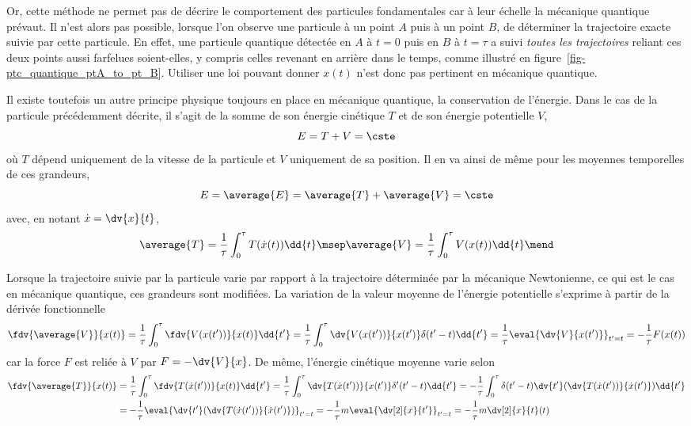 \par
Or, cette méthode ne permet pas de décrire le comportement des particules fondamentales
car à leur échelle la mécanique quantique prévaut.
Il n'est alors pas possible, lorsque l'on observe une particule à un point $A$ puis à un point $B$, de déterminer la trajectoire exacte suivie par cette particule.
En effet,
une particule quantique détectée
en $A$ à $t=0$ puis en $B$ à $t=\tau$
a suivi \emph{toutes les trajectoires} reliant ces deux points
aussi farfelues soient-elles,
y compris celles revenant en arrière dans le temps,
comme illustré en figure~\ref{fig-ptc_quantique_ptA_to_pt_B}.
Utiliser une loi pouvant donner $x(t)$ n'est donc pas pertinent en mécanique quantique.
\par
Il existe toutefois un autre principe physique toujours en place en mécanique quantique, la conservation de l'énergie.
Dans le cas de la particule précédemment décrite, il s'agit de la somme de son énergie cinétique $T$ et de son énergie potentielle $V$, \ie
\begin{equation}
E = T + V = \cste
\end{equation}
où $T$ dépend uniquement de la vitesse de la particule et $V$ uniquement de sa position. %
Il en va ainsi de même pour les moyennes temporelles de ces grandeurs,
\begin{equation}
E = \average{E} = \average{T} + \average{V} = \cste
\end{equation}
avec, en notant $\dot{x}=\dv{x}{t}$,
\begin{equation}
\average{T} = \frac{1}{\tau}\int_0^\tau T(\dot{x}(t)) \dd{t}
\msep
\average{V} = \frac{1}{\tau}\int_0^\tau V(x(t)) \dd{t}
\mend
\end{equation}
\par
Lorsque la trajectoire suivie par la particule varie par rapport à la trajectoire déterminée par la mécanique Newtonienne, ce qui est le cas en mécanique quantique, ces grandeurs sont modifiées.
La variation de la valeur moyenne de l'énergie potentielle s'exprime à partir de la dérivée fonctionnelle
\begin{equation}
\fdv{\average{V}}{x(t)}
= \frac{1}{\tau}\int_0^\tau \fdv{V(x(t'))}{x(t)} \dd{t'}
= \frac{1}{\tau}\int_0^\tau \dv{V(x(t'))}{x(t')}\delta(t'-t) \dd{t'}
= \frac{1}{\tau}\eval{\dv{V}{x(t')}}_{t'=t}
= -\frac{1}{\tau}F(x(t))
\end{equation}
car la force $F$ est reliée à $V$ par $F = - \dv{V}{x}$.
De même, l'énergie cinétique moyenne varie selon
\begin{align}
\fdv{\average{T}}{x(t)}
&
= \frac{1}{\tau}\int_0^\tau \fdv{T(\dot{x}(t'))}{x(t)} \dd{t'}
=\frac{1}{\tau}\int_0^\tau \dv{T(\dot{x}(t'))}{x(t')}\delta'(t'-t) \dd{t'}
=-\frac{1}{\tau}\int_0^\tau \delta(t'-t) \dv{t'}(\dv{T(\dot{x}(t'))}{\dot{x}(t')}) \dd{t'}
\nonumber
\\&
=-\frac{1}{\tau}\eval{\dv{t'}(\dv{T(\dot{x}(t'))}{\dot{x}(t')})}_{t'=t}
=-\frac{1}{\tau}m\eval{\dv[2]{x}{{t'}}}_{t'=t}
=-\frac{1}{\tau}m{\dv[2]{x}{t}}(t)
\end{align}
